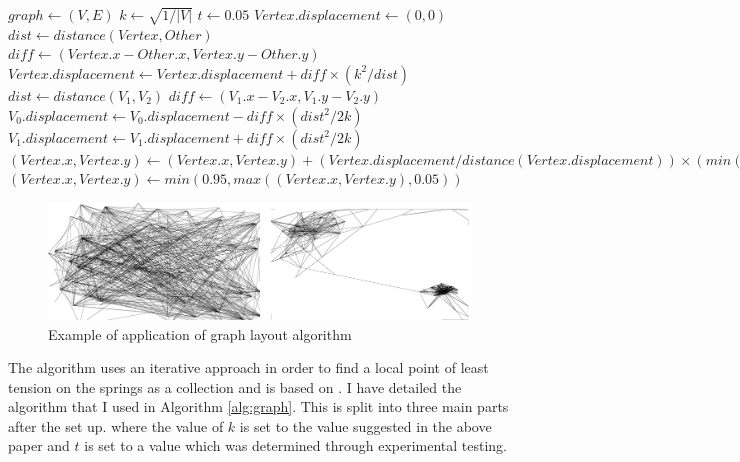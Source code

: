 \documentclass[12pt,a4paper]{article}
\begin{document}
\begin{algorithm}[htb]
\caption{Graph sprint-directed layout algorithm}
\label{alg:graph}
\begin{algorithmic}
\State $graph \gets (V, E)$ 
\State $k \gets \sqrt{1/|V|}$
\State $t \gets 0.05$
	\State $Vertex.displacement \gets (0,0)$
		\State $dist \gets distance(Vertex, Other)$ 
		\State $diff \gets (Vertex.x-Other.x, Vertex.y-Other.y)$
		\State $Vertex.displacement \gets Vertex.displacement + diff \times (k^{2}/dist)$
	\EndFor
\EndFor
{} 
	\State $dist \gets distance(V_{1}, V_{2})$
	\State $diff \gets (V_{1}.x-V_{2}.x, V_{1}.y-V_{2}.y)$
	\State $V_{0}.displacement \gets V_{0}.displacement - diff \times (dist^{2}/2k)$
	\State $V_{1}.displacement \gets V_{1}.displacement + diff \times (dist^{2}/2k)$
\EndFor
{}
	\State $(Vertex.x, Vertex.y) \gets (Vertex.x, Vertex.y) + (Vertex.displacement/distance(Vertex.displacement)) \times (min(distance(Vertex.displacement), t))$ 
	\State $(Vertex.x, Vertex.y) \gets min(0.95, max((Vertex.x, Vertex.y), 0.05))$ 
\EndFor
\end{algorithmic}
\end{algorithm}

\begin{figure}[htb]
\caption{Example of application of graph layout algorithm}
\label{fig:layout}
\centering
\includegraphics[scale=0.12]{Pygame.png}
\end{figure}

The algorithm uses an iterative approach in order to find a local point of least tension on the springs as a collection and is based on \cite{fruchterman1991graph}. I have detailed the algorithm that I used in Algorithm \ref{alg:graph}. This is split into three main parts after the set up. where the value of $k$ is set to the value suggested in the above paper and $t$ is set to a value which was determined through experimental testing.
\end{document}
